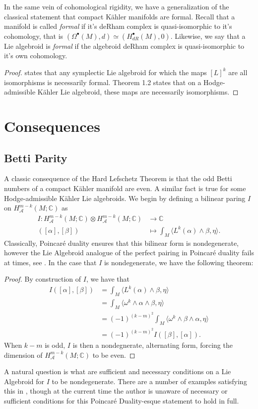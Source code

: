 \documentclass{amsart}
\newcommand{\C}{\mathbb{C}}
\newcommand{\ra}{\rightarrow}
\theoremstyle{definition}
\newcommand{\A}{\mathcal{A}}
\theoremstyle{definition}
\begin{document}
In the same vein of cohomological rigidity, we have a generalization of the classical statement that compact Kähler manifolds are formal. Recall that a manifold is called \textit{formal} if it's deRham complex is quasi-isomorphic to it's cohomology, that is $(\Omega^\bullet(M),d) \simeq(H_{dR}^\bullet(M),0)$. Likewise, we say that a Lie algebroid is \textit{formal} if the algebroid deRham complex is quasi-isomorphic to it's own cohomology.
\Formality*
\begin{proof}
    \cite[Corollary 78]{RANKIN2026102324} states that any symplectic Lie algebroid for which the maps $[L]^k$ are all isomorphisms is necessarily formal. Theorem 1.2 states that on a Hodge-admissible Kähler Lie algebroid, these maps are necessarily isomorphisms.
\end{proof}

\section{Consequences}
\subsection{Betti Parity}
A classic consequence of the Hard Lefschetz Theorem is that the odd Betti numbers of a compact Kähler manifold are even. A similar fact is true for some Hodge-admissible Kähler Lie algebroids. We begin by defining a bilinear paring $I$ on $H^{m-k}_\A(M;\C)$ as
\begin{align*}
    I:H_\A^{m-k}(M;\C) \otimes H_\A^{m-k}(M;\C) &\ra \C \\
    ([\alpha],[\beta]) &\mapsto \int_M \langle L^k(\alpha) \wedge \beta,\eta \rangle.
\end{align*}
Classically, Poincar\'e duality ensures that this bilinear form is nondegenerate, however the Lie Algebroid analogue of the perfect pairing in Poincar\'e duality fails at times, see \cite[Examples 5.7 and 5.8]{evens1996transversemeasuresmodularclass}. In the case that $I$ is nondegenerate, we have the following theorem:
\betti*
\begin{proof}
    By construction of $I$, we have that 
    \begin{align*}
        I([\alpha],[\beta]) &=\int_M \langle L^k(\alpha) \wedge \beta , \eta \rangle \\
        &=\int_M \langle \omega^k \wedge \alpha \wedge \beta , \eta \rangle \\
        &=(-1)^{(k-m)^2}\int_M\langle \omega^k \wedge \beta \wedge \alpha , \eta \rangle \\
        &=(-1)^{(k-m)^2} I([\beta],[\alpha]).
    \end{align*}
    When $k-m$ is odd, $I$ is then a nondegnerate, alternating form, forcing the dimension of $H_\A^{m-k}(M;\C)$ to be even. 
\end{proof}
A natural question is what are sufficient and necessary conditions on a Lie Algebroid for $I$ to be nondegenerate. There are a number of examples satisfying this in \cite[section 5]{evens1996transversemeasuresmodularclass}, though at the current time the author is unaware of necessary or sufficient conditions for this Poincar\'e Duality-esque statement to hold in full.
\end{document}
